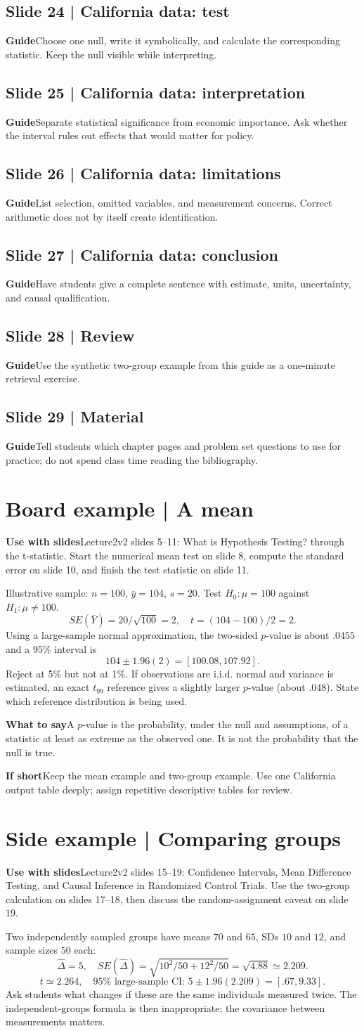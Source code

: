 \documentclass[11pt,a4paper]{article}
\newcommand{\heading}[1]{\section*{\color{accent}#1}}
\newcommand{\slideheading}[1]{\subsection*{\color{accent}#1}}
\newcommand{\cue}[2]{\par\noindent\textbf{#1}\quad #2\par}
\newcommand{\slideguide}[3]{\slideheading{Slide #1 | #2}\cue{Guide}{#3}}
\begin{document}
\slideguide{24}{California data: test}{Choose one null, write it symbolically, and calculate the corresponding statistic. Keep the null visible while interpreting.}
\slideguide{25}{California data: interpretation}{Separate statistical significance from economic importance. Ask whether the interval rules out effects that would matter for policy.}
\slideguide{26}{California data: limitations}{List selection, omitted variables, and measurement concerns. Correct arithmetic does not by itself create identification.}
\slideguide{27}{California data: conclusion}{Have students give a complete sentence with estimate, units, uncertainty, and causal qualification.}
\slideguide{28}{Review}{Use the synthetic two-group example from this guide as a one-minute retrieval exercise.}
\slideguide{29}{Material}{Tell students which chapter pages and problem set questions to use for practice; do not spend class time reading the bibliography.}

\heading{Board example | A mean}
\cue{Use with slides}{Lecture2v2 slides 5--11: What is Hypothesis Testing? through the t-statistic. Start the numerical mean test on slide 8, compute the standard error on slide 10, and finish the test statistic on slide 11.}
Illustrative sample: $n=100$, $\bar y=104$, $s=20$. Test $H_0:\mu=100$ against $H_1:\mu\ne100$.
\[
SE(\bar Y)=20/\sqrt{100}=2,\quad t=(104-100)/2=2.
\]
Using a large-sample normal approximation, the two-sided $p$-value is about $.0455$ and a 95\% interval is
\[
104\pm1.96(2)=[100.08,107.92].
\]
Reject at 5\% but not at 1\%. If observations are i.i.d. normal and variance is estimated, an exact $t_{99}$ reference gives a slightly larger $p$-value (about $.048$). State which reference distribution is being used.
\cue{What to say}{A $p$-value is the probability, under the null and assumptions, of a statistic at least as extreme as the observed one. It is not the probability that the null is true.}
\cue{If short}{Keep the mean example and two-group example. Use one California output table deeply; assign repetitive descriptive tables for review.}

\newpage
\heading{Side example | Comparing groups}
\cue{Use with slides}{Lecture2v2 slides 15--19: Confidence Intervals, Mean Difference Testing, and Causal Inference in Randomized Control Trials. Use the two-group calculation on slides 17--18, then discuss the random-assignment caveat on slide 19.}
Two independently sampled groups have means $70$ and $65$, SDs $10$ and $12$, and sample sizes $50$ each:
\[
\widehat\Delta=5,\quad SE(\widehat\Delta)
=\sqrt{10^2/50+12^2/50}=\sqrt{4.88}\simeq2.209.
\]
\[
t\simeq2.264,\quad 95\%\text{ large-sample CI: }
5\pm1.96(2.209)=[.67,9.33].
\]
Ask students what changes if these are the same individuals measured twice. The independent-groups formula is then inappropriate; the covariance between measurements matters.
\end{document}
